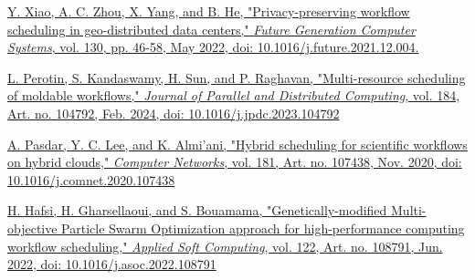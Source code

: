 \documentclass[a4paper, final]{article}
\begin{document}
\begin{thebibliography}{0}
	\href{https://doi.org/10.1016/j.future.2021.12.004}{
    Y. Xiao, A. C. Zhou, X. Yang, and B. He,
    "Privacy-preserving workflow scheduling in geo-distributed data centers,"
    \textit{Future Generation Computer Systems}, vol. 130, pp. 46-58, May 2022,
    doi: 10.1016/j.future.2021.12.004.
    }

	\href{https://doi.org/10.1016/j.jpdc.2023.104792}{
    L. Perotin, S. Kandaswamy, H. Sun, and P. Raghavan,
    "Multi-resource scheduling of moldable workflows,"
    \textit{Journal of Parallel and Distributed Computing}, vol. 184, Art. no. 104792, Feb. 2024,
    doi: 10.1016/j.jpdc.2023.104792
    }

	\href{https://doi.org/10.1016/j.comnet.2020.107438}{
    A. Pasdar, Y. C. Lee, and K. Almi’ani,
    "Hybrid scheduling for scientific workflows on hybrid clouds,"
    \textit{Computer Networks}, vol. 181, Art. no. 107438, Nov. 2020,
    doi: 10.1016/j.comnet.2020.107438
    }

	\href{https://doi.org/10.1016/j.asoc.2022.108791}{
    H. Hafsi, H. Gharsellaoui, and S. Bouamama,
    "Genetically-modified Multi-objective Particle Swarm Optimization approach for high-performance 
    computing workflow scheduling,"
    \textit{Applied Soft Computing}, vol. 122, Art. no. 108791, Jun. 2022,
    doi: 10.1016/j.asoc.2022.108791
    }
\end{thebibliography}

\newpage
\end{document}
